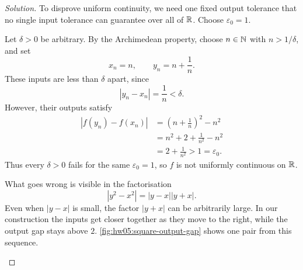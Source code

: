 \begin{proof}[Solution]
  To disprove uniform continuity, we need one fixed output tolerance
  that no single input tolerance can guarantee over all of $\mathbb{R}$.
  Choose $\varepsilon_0=1$.

  Let $\delta>0$ be arbitrary. By the Archimedean property, choose
  $n\in\mathbb{N}$ with $n>1/\delta$, and set
  \[
    x_n=n,\qquad y_n=n+\frac1n.
  \]
  These inputs are less than $\delta$ apart, since
  \[
    |y_n-x_n|=\frac1n<\delta.
  \]
  However, their outputs satisfy
  \begin{align*}
    |f(y_n)-f(x_n)|
      &=\left(n+\frac1n\right)^2-n^2\\
      &=n^2+2+\frac1{n^2}-n^2\\
      &=2+\frac1{n^2}>1=\varepsilon_0.
  \end{align*}
  Thus every $\delta>0$ fails for the same $\varepsilon_0=1$, so $f$
  is not uniformly continuous on $\mathbb{R}$.

  What goes wrong is visible in the factorisation
  \[
    |y^2-x^2|=|y-x||y+x|.
  \]
  Even when $|y-x|$ is small, the factor $|y+x|$ can be arbitrarily
  large. In our construction the inputs get closer together as they
  move to the right, while the output gap stays above $2$.
  \autoref{fig:hw05:square-output-gap} shows one pair from this sequence.

  \begin{marginfigure}
    \centering
    
    \caption[Small input gaps with large output gaps.]{%
      A local view of $y=x^2$ for the pair $x_n=n$,
      $y_n=n+1/n$ when $n=3$. A horizontal gap of $1/n$ produces a
      vertical gap of $2+1/n^2$. The two axes use different scales.}
    \label{fig:hw05:square-output-gap}
  \end{marginfigure}
\end{proof}
